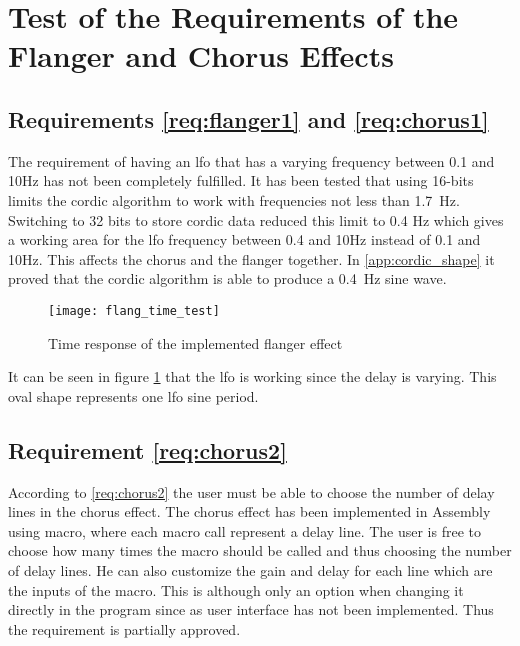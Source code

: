 \newpage
\section{Test of the Requirements of the Flanger and Chorus Effects}

\subsection{Requirements \ref{req:flanger1} and \ref{req:chorus1}}

The requirement of having an \gls{lfo} that has a varying frequency between 0.1 and 10Hz has not been completely fulfilled. It has been tested that using 16-bits limits the \gls{cordic} algorithm to work with frequencies not less than \SI{1.7}{\hertz}. Switching to 32 bits to store \gls{cordic} data reduced this limit to 0.4 Hz which gives a working area for the \gls{lfo} frequency between 0.4 and 10Hz instead of 0.1 and 10Hz. This affects the chorus and the flanger together. In \autoref{app:cordic_shape} it proved that the \gls{cordic} algorithm is able to produce a \SI{0.4}{\hertz} sine wave.

\begin{figure}[hbt]
	\centering
  \texttt{[image: flang\_time\_test]}
  \caption{Time response of the implemented flanger effect}
  \label{fig:flang_time_test}
\end{figure}

It can be seen in figure \ref{fig:flang_time_test} that the \gls{lfo} is working since the delay is varying. This oval shape represents one \gls{lfo} sine period. 



\subsection{Requirement \ref{req:chorus2}}

According to \autoref{req:chorus2} the user must be able to choose the number of delay lines in the chorus effect. The chorus effect has been implemented in Assembly using macro, where each macro call represent a delay line. The user is free to choose how many times the macro should be called and thus choosing the number of delay lines. He can also customize the gain and delay for each line which are the inputs of the macro. This is although only an option when changing it directly in the program since as user interface has not been implemented. Thus the requirement is partially approved.

